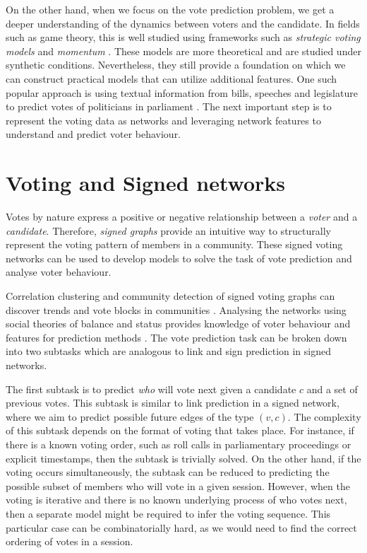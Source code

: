 On the other hand, when we focus on the vote prediction problem, we get a deeper understanding of the dynamics between voters and the candidate.
In fields such as game theory, this is well studied using frameworks such as \textit{strategic voting models} and \textit{momentum} \cite{meir2020strategic,zou2015strategicDoodle,ali2006a,banerjee1992simple,tal2015a}.
These models are more theoretical and are studied under synthetic conditions.
Nevertheless, they still provide a foundation on which we can construct practical models that can utilize additional features.
One such popular approach is using textual information from bills, speeches and legislature to predict votes of politicians in parliament \cite{budhwar2018predicting,gerrish2011predicting}.
The next important step is to represent the voting data as networks and leveraging network features to understand and predict voter behaviour.


\section{Voting and Signed networks}
\label{sec:voting-signed-networks}
Votes by nature express a positive or negative relationship between a \textit{voter} and a \textit{candidate}.
Therefore, \textit{signed graphs} provide an intuitive way to structurally represent the voting pattern of members in a community.
These signed voting networks can be used to develop models to solve the task of vote prediction and analyse voter behaviour.

Correlation clustering and community detection of signed voting graphs can discover trends and vote blocks in communities \cite{brito2020aBrazil,arinik2017signed}.
Analysing the networks using social theories of balance and status provides knowledge of voter behaviour and features for prediction methods \cite{levorato2016brazilian,derr2018congressional}.
The vote prediction task can be broken down into two subtasks which are analogous to link and sign prediction in signed networks. 

The first subtask is to predict \textit{who} will vote next given a candidate $c$ and a set of previous votes.
This subtask is similar to link prediction in a signed network, where we aim to predict possible future edges of the type $(v,c)$.
The complexity of this subtask depends on the format of voting that takes place.
For instance, if there is a known voting order, such as roll calls in parliamentary proceedings or explicit timestamps, then the subtask is trivially solved.
On the other hand, if the voting occurs simultaneously, the subtask can be reduced to predicting the possible subset of members who will vote in a given session.
However, when the voting is iterative and there is no known underlying process of who votes next, then a separate model might be required to infer the voting sequence.
This particular case can be combinatorially hard, as we would need to find the correct ordering of votes in a session.

